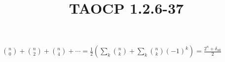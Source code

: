 \documentclass{article}
\title{TAOCP 1.2.6\mbox{-}37}
\begin{document}
\maketitle

\( \binom{n}{0} + \binom{n}{2} + \binom{n}{4} + \cdots = \frac{1}{2}(\sum_{k} \binom{n}{k} + \sum_{k} \binom{n}{k}{(-1)}^{k}) = \frac{2^{n} + \delta_{n0}}{2} \)
\end{document}
